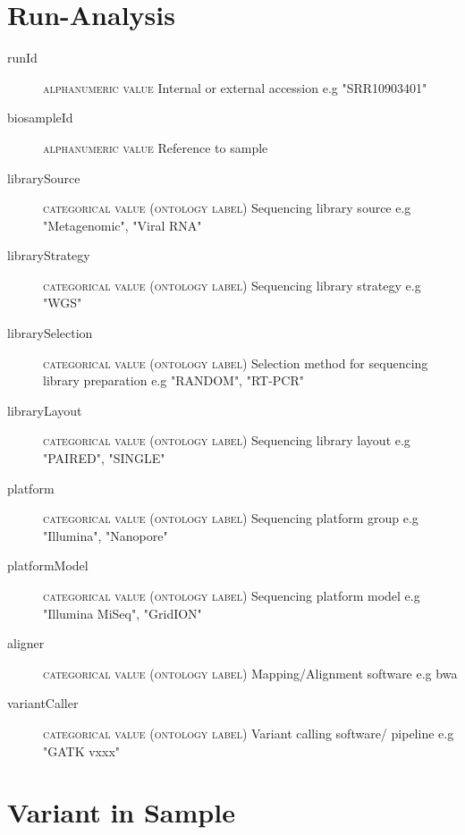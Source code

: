 \documentclass[a4paper, 10pt]{article}        %
\begin{document}
   \section*{ {\color{teal} Run-Analysis}}
  
  \begin{description}
	\item[runId] {\textsc{alphanumeric value}}  Internal or external accession e.g "SRR10903401"
	\item[biosampleId] {\textsc{alphanumeric value}}  Reference to sample 	\item[librarySource] {\textsc{categorical value (ontology label)}}  Sequencing library source e.g "Metagenomic", "Viral RNA"
	\item[libraryStrategy]  {\textsc{categorical value (ontology label)}} Sequencing library strategy e.g "WGS"
	\item[librarySelection] {\textsc{categorical value (ontology label)}} Selection method for sequencing library preparation e.g "RANDOM", "RT-PCR"
	\item[libraryLayout] {\textsc{categorical value (ontology label)}}  Sequencing library layout e.g "PAIRED", "SINGLE"
	\item[platform] {\textsc{categorical value (ontology label)}} Sequencing platform group e.g "Illumina", "Nanopore"
	\item[platformModel] {\textsc{categorical value (ontology label)}} Sequencing platform model e.g "Illumina MiSeq", "GridION"
	 \item[aligner]  {\textsc{categorical value (ontology label)}} Mapping/Alignment software e.g bwa
	  \item[variantCaller]  {\textsc{categorical value (ontology label)}} Variant calling software/ pipeline e.g "GATK vxxx" %
 \end{description}
 
 
 
   \section*{ {\color{teal} Variant in Sample}}
  
\end{document}
